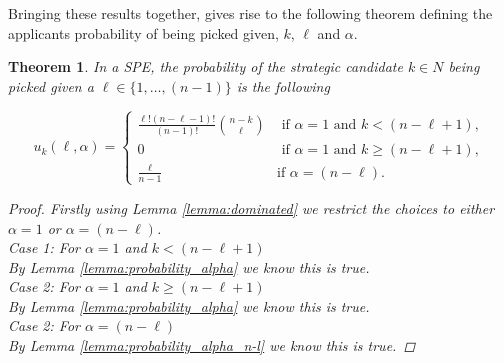 \documentclass{article}
\newtheorem{theorem}{Theorem}
\begin{document}
Bringing these results together, gives rise to the following theorem defining the applicants probability of being picked given, $k$, $\ell$ and $\alpha$.

\begin{theorem}
\label{theorem:applicant_probabilities}
In a SPE, the probability of the strategic candidate $k \in N$ being picked given a $\ell \in \{1, \ldots, (n-1) \}$  is the following

$$
    u_k(\ell, \alpha) = 
\begin{cases}
    \frac{\ell!(n-\ell-1)!}{(n-1)!} \binom{n-k}{\ell} & \text{ if } \alpha = 1 \text{ and } k < (n-\ell+1), \\
    0 & \text{ if } \alpha = 1 \text{ and } k \geq (n-\ell+1), \\
    \frac{\ell}{n-1}              & \text{if } \alpha = (n-\ell).
\end{cases}
$$

\begin{proof}
Firstly using Lemma \ref{lemma:dominated} we restrict the choices to either $\alpha=1$ or $\alpha=(n-\ell)$. \\
Case 1: For $\alpha=1$ and $k < (n-\ell+1)$ \\
By Lemma \ref{lemma:probability_alpha} we know this is true. \\
Case 2: For $\alpha=1$ and $k \geq (n-\ell+1)$ \\
By Lemma \ref{lemma:probability_alpha} we know this is true. \\
Case 2: For $\alpha=(n-\ell)$ \\
By Lemma \ref{lemma:probability_alpha_n-l} we know this is true. 

\end{proof}
\end{theorem}
\end{document}
